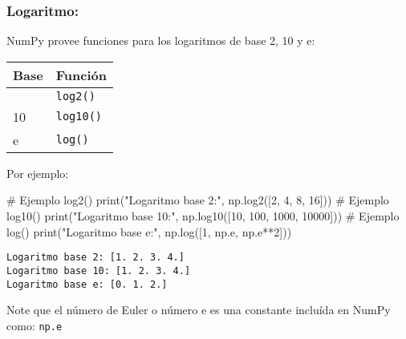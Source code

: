 \documentclass[
  letterpaper,
  DIV=11,
  numbers=noendperiod]{scrreprt}
\newenvironment{Shaded}{\begin{snugshade}}{\end{snugshade}}
\newcommand{\BuiltInTok}[1]{\textcolor[rgb]{0.00,0.23,0.31}{#1}}
\newcommand{\CommentTok}[1]{\textcolor[rgb]{0.37,0.37,0.37}{#1}}
\newcommand{\DecValTok}[1]{\textcolor[rgb]{0.68,0.00,0.00}{#1}}
\newcommand{\NormalTok}[1]{\textcolor[rgb]{0.00,0.23,0.31}{#1}}
\newcommand{\OperatorTok}[1]{\textcolor[rgb]{0.37,0.37,0.37}{#1}}
\newcommand{\StringTok}[1]{\textcolor[rgb]{0.13,0.47,0.30}{#1}}
\begin{document}
\subsubsection{Logaritmo:}\label{logaritmo}

NumPy provee funciones para los logaritmos de base 2, 10 y e:

\begin{longtable}[]{@{}ll@{}}
\toprule\noalign{}
Base & Función \\
\midrule\noalign{}
\endhead
\bottomrule\noalign{}
\endlastfoot
2 & \texttt{log2()} \\
10 & \texttt{log10()} \\
e & \texttt{log()} \\
\end{longtable}

Por ejemplo:

\begin{Shaded}
\begin{Highlighting}[]
\CommentTok{\# Ejemplo log2()}
\BuiltInTok{print}\NormalTok{(}\StringTok{"Logaritmo base 2:"}\NormalTok{, np.log2([}\DecValTok{2}\NormalTok{, }\DecValTok{4}\NormalTok{, }\DecValTok{8}\NormalTok{, }\DecValTok{16}\NormalTok{]))}
\CommentTok{\# Ejemplo log10()}
\BuiltInTok{print}\NormalTok{(}\StringTok{"Logaritmo base 10:"}\NormalTok{, np.log10([}\DecValTok{10}\NormalTok{, }\DecValTok{100}\NormalTok{, }\DecValTok{1000}\NormalTok{, }\DecValTok{10000}\NormalTok{]))}
\CommentTok{\# Ejemplo log()}
\BuiltInTok{print}\NormalTok{(}\StringTok{"Logaritmo base e:"}\NormalTok{, np.log([}\DecValTok{1}\NormalTok{, np.e, np.e}\OperatorTok{**}\DecValTok{2}\NormalTok{]))}
\end{Highlighting}
\end{Shaded}

\begin{verbatim}
Logaritmo base 2: [1. 2. 3. 4.]
Logaritmo base 10: [1. 2. 3. 4.]
Logaritmo base e: [0. 1. 2.]
\end{verbatim}

\begin{tcolorbox}[enhanced jigsaw, colframe=quarto-callout-note-color-frame, leftrule=.75mm, titlerule=0mm, left=2mm, bottomtitle=1mm, arc=.35mm, opacitybacktitle=0.6, toptitle=1mm, colbacktitle=quarto-callout-note-color!10!white, opacityback=0, breakable, title=\textcolor{quarto-callout-note-color}{\faInfo}\hspace{0.5em}{Note}, toprule=.15mm, rightrule=.15mm, colback=white, coltitle=black, bottomrule=.15mm]

Note que el número de Euler o número e es una constante incluída en
NumPy como: \texttt{np.e}

\end{tcolorbox}
\end{document}
